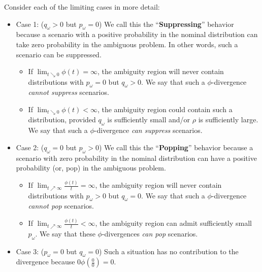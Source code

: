 \documentclass[opre,nonblindrev]{informs3} %
\begin{document}
Consider each of the limiting cases in more detail:
\begin{itemize}
	\item {\sc Case 1:} ($q_\omega > 0$ but $p_\omega = 0$)
		We call this the ``{\bf Suppressing}'' behavior because a scenario with a positive probability in the nominal distribution can take zero probability in the ambiguous problem. 
		In other words, such a scenario can be suppressed. 
	\begin{itemize}
		\item If $\lim_{t \searrow 0} \phi(t) = \infty$, the ambiguity region will never contain distributions with $p_\omega = 0$ but $q_\omega > 0$.
			We say that such a  $\phi$-divergence \emph{cannot suppress} scenarios.

		\item  If $\lim_{t \searrow 0} \phi(t) < \infty$, the ambiguity region could contain such a distribution, provided $q_\omega$ is sufficiently small and/or $\rho$ is sufficiently large.
			We say that such a $\phi$-divergence  \emph{can suppress} scenarios.
	\end{itemize}

	\item {\sc Case 2:} ($q_\omega = 0$ but $p_\omega > 0$)
		We call this the ``{\bf Popping}'' behavior because a scenario with zero probability in the nominal distribution can have a positive probability (or, pop) in the ambiguous problem. 
	\begin{itemize}
		\item If $\lim_{t \nearrow \infty} \frac{\phi(t)}{t} = \infty$, the ambiguity region will never contain distributions with $p_\omega > 0$ but $q_\omega = 0$.
			We say that such a $\phi$-divergence \emph{cannot pop} scenarios.

		\item If $\lim_{t \nearrow \infty} \frac{\phi(t)}{t} < \infty$, the ambiguity region can admit sufficiently small $p_\omega$.
			We say that these $\phi$-divergences \emph{can pop} scenarios.
	\end{itemize}

	\item {\sc Case 3:} ($p_\omega = 0$ but $q_\omega = 0$)
		Such a situation has no contribution to the divergence because $0 \phi\left(\tfrac{0}{0}\right) = 0$.
\end{itemize}
\end{document}
